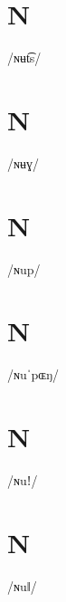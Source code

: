 \documentclass[10pt,a4paper,twoside]{book}
\begin{document}
\section*{N}

\begin{multicols}{3}
 {/ɴʉt͡s/} {}
\end{multicols}

\section*{N}

\begin{multicols}{3}
 {/ɴʉɣ/} {}
\end{multicols}

\section*{N}

\begin{multicols}{3}
 {/ɴup/} {}
\end{multicols}

\section*{N}

\begin{multicols}{3}
 {/ɴuˈpɶŋ/} {}
\end{multicols}

\section*{N}

\begin{multicols}{3}
 {/ɴuǃ/} {}
\end{multicols}

\section*{N}

\begin{multicols}{3}
 {/ɴuǁ/} {}
\end{multicols}
\end{document}
